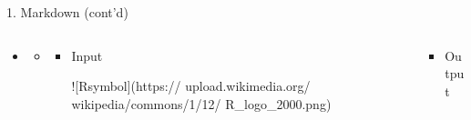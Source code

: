 \documentclass[14pt, aspectratio=169, sectionpage=simple, xclolor=table]{beamer}
\begin{document}
\begin{frame}[fragile, t]{1. Markdown (cont'd)}
\begin{itemize}
\item {}
\begin{itemize}
\item[] 

\begin{columns}
\begin{column}{0.45\textwidth}
\vspace{1cm}
\begin{itemize}
	\item Input
	
	\begin{code11}
		![Rsymbol](https://
		upload.wikimedia.org/
		wikipedia/commons/1/12/
		R_logo_2000.png)
	\end{code11}
\end{itemize}
\end{column}%
\hfill
\begin{column}{0.45\textwidth}
\vspace{0cm}
\begin{itemize}
	\item Output
	\\
	
\end{itemize}
\end{column}%
\end{columns}
\end{itemize}
\end{itemize}



\end{frame}
\end{document}
